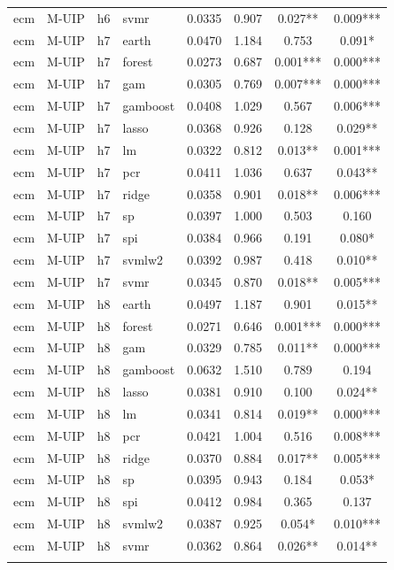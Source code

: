 \begin{ThreePartTable}
\begin{longtable}[t]{llclcccc}
ecm & M-UIP & h6 & svmr & 0.0335 & 0.907 & 0.027** & 0.009***\\
\addlinespace
ecm & M-UIP & h7 & earth & 0.0470 & 1.184 & 0.753 & 0.091*\\
ecm & M-UIP & h7 & forest & 0.0273 & 0.687 & 0.001*** & 0.000***\\
ecm & M-UIP & h7 & gam & 0.0305 & 0.769 & 0.007*** & 0.000***\\
ecm & M-UIP & h7 & gamboost & 0.0408 & 1.029 & 0.567 & 0.006***\\
ecm & M-UIP & h7 & lasso & 0.0368 & 0.926 & 0.128 & 0.029**\\
ecm & M-UIP & h7 & lm & 0.0322 & 0.812 & 0.013** & 0.001***\\
ecm & M-UIP & h7 & pcr & 0.0411 & 1.036 & 0.637 & 0.043**\\
ecm & M-UIP & h7 & ridge & 0.0358 & 0.901 & 0.018** & 0.006***\\
ecm & M-UIP & h7 & sp & 0.0397 & 1.000 & 0.503 & 0.160\\
ecm & M-UIP & h7 & spi & 0.0384 & 0.966 & 0.191 & 0.080*\\
ecm & M-UIP & h7 & svmlw2 & 0.0392 & 0.987 & 0.418 & 0.010**\\
ecm & M-UIP & h7 & svmr & 0.0345 & 0.870 & 0.018** & 0.005***\\
\addlinespace
ecm & M-UIP & h8 & earth & 0.0497 & 1.187 & 0.901 & 0.015**\\
ecm & M-UIP & h8 & forest & 0.0271 & 0.646 & 0.001*** & 0.000***\\
ecm & M-UIP & h8 & gam & 0.0329 & 0.785 & 0.011** & 0.000***\\
ecm & M-UIP & h8 & gamboost & 0.0632 & 1.510 & 0.789 & 0.194\\
ecm & M-UIP & h8 & lasso & 0.0381 & 0.910 & 0.100 & 0.024**\\
ecm & M-UIP & h8 & lm & 0.0341 & 0.814 & 0.019** & 0.000***\\
ecm & M-UIP & h8 & pcr & 0.0421 & 1.004 & 0.516 & 0.008***\\
ecm & M-UIP & h8 & ridge & 0.0370 & 0.884 & 0.017** & 0.005***\\
ecm & M-UIP & h8 & sp & 0.0395 & 0.943 & 0.184 & 0.053*\\
ecm & M-UIP & h8 & spi & 0.0412 & 0.984 & 0.365 & 0.137\\
ecm & M-UIP & h8 & svmlw2 & 0.0387 & 0.925 & 0.054* & 0.010***\\
ecm & M-UIP & h8 & svmr & 0.0362 & 0.864 & 0.026** & 0.014**\\
\addlinespace

\end{longtable}
\end{ThreePartTable}
